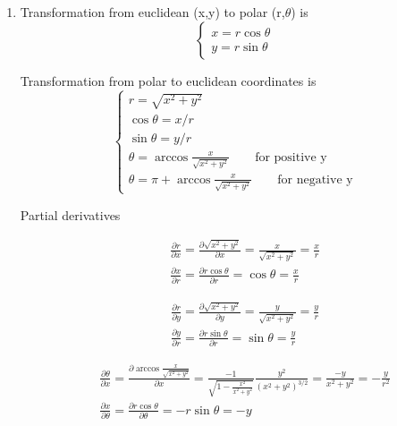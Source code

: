 \documentclass[12pt,a4paper]{article}
\begin{document}
\begin{enumerate}















\item

Transformation from euclidean (x,y) to polar (r,$\theta$) is
\begin{equation*}
	\begin{cases}
	x= r\cos\theta \\
	y= r\sin\theta
	\end{cases}
\end{equation*}

Transformation from polar to euclidean coordinates is
\begin{equation*}
	\begin{cases}
	r= \sqrt{x^2 + y^2} \\
	\cos\theta= x/r \\
	\sin\theta=y/r \\
	\theta = \arccos{\frac{x}{\sqrt{x^2+y^2}}} \qquad \text{for positive y} \\
	\theta = \pi + \arccos{\frac{x}{\sqrt{x^2+y^2}}} \qquad \text{for negative y}
	\end{cases}
\end{equation*}

Partial derivatives

\begin{eqnarray*}
&&\frac{\partial r}{\partial x} = \frac{\partial{\sqrt{x^2 + y^2}}}{\partial x} = \frac{ x }{ \sqrt{x^2 + y^2} } = \frac x r \\
&& \frac{ \partial x }{ \partial r } = \frac{ \partial r\cos\theta }{ \partial r } = \cos\theta = \frac x r
\end{eqnarray*}

\begin{eqnarray*}
&&\frac{ \partial r }{ \partial y } = \frac{\partial \sqrt{x^2 + y^2} }{ \partial y } = \frac{ y }{ \sqrt{x^2 + y^2} } = \frac y r \\
&&\frac{ \partial y }{ \partial r } = \frac{ \partial r\sin\theta }{ \partial r } = \sin\theta = \frac{y}{r}
\end{eqnarray*}

\begin{eqnarray*}
&& \frac{ \partial\theta }{ \partial x } = \frac{ \partial\arccos{\frac{x}{\sqrt{x^2+y^2}} } }{ \partial x } = \frac{-1}{\sqrt{1 - \frac{x^2}{x^2+y^2} }} \frac{y^2}{(x^2+y^2)^{3/2}} = \frac{-y}{x^2+y^2} = -\frac{y}{r^2} \\
&& \frac{\partial x}{\partial \theta} = \frac{\partial r\cos\theta}{\partial \theta} = -r\sin\theta = -y
\end{eqnarray*}
{\color{red}{Page 432 equation 11.23?}}



\end{enumerate}
\end{document}
